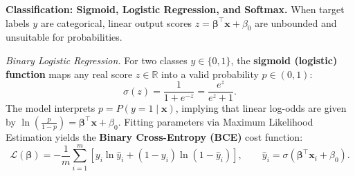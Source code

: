 \documentclass[11pt,a4paper]{article}
\begin{document}
	\begin{practicebox}

	\end{practicebox}

	\textbf{Classification: Sigmoid, Logistic Regression, and Softmax.} When target labels $y$ are categorical, linear output scores $z = \boldsymbol{\beta}^{\!\top}\mathbf{x} + \beta_0$ are unbounded and unsuitable for probabilities.
	
	\emph{Binary Logistic Regression.} For two classes $y \in \{0, 1\}$, the \textbf{sigmoid (logistic) function} maps any real score $z \in \mathbb{R}$ into a valid probability $p \in (0, 1)$:
	\begin{equation}
		\sigma(z) = \frac{1}{1 + e^{-z}} = \frac{e^{z}}{e^{z} + 1}.
	\end{equation}
	The model interprets $p = P(y=1 \mid \mathbf{x})$, implying that linear log-odds are given by $\ln\left(\frac{p}{1-p}\right) = \boldsymbol{\beta}^{\!\top}\mathbf{x} + \beta_0$. Fitting parameters via Maximum Likelihood Estimation yields the \textbf{Binary Cross-Entropy (BCE)} cost function:
	\begin{equation}
		\mathcal{L}(\boldsymbol{\beta}) = -\frac{1}{m} \sum_{i=1}^{m} \left[ y_i \ln \hat{y}_i + (1 - y_i) \ln (1 - \hat{y}_i) \right], \qquad \hat{y}_i = \sigma(\boldsymbol{\beta}^{\!\top}\mathbf{x}_i + \beta_0).
	\end{equation}
	
\end{document}
